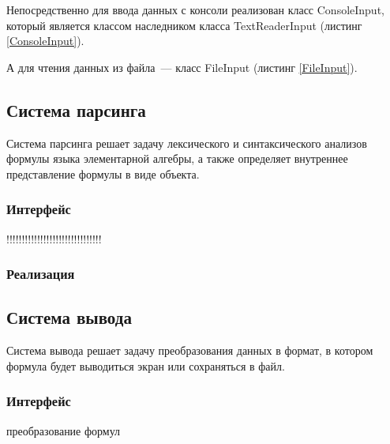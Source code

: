 

Непосредственно для ввода данных с консоли реализован класс ConsoleInput, который является классом наследником класса TextReaderInput (листинг \ref{ConsoleInput}).



А для чтения данных из файла~--- класс FileInput  (листинг \ref{FileInput}).



\subsection{Система парсинга}

Система парсинга решает задачу лексического и синтаксического анализов формулы языка элементарной алгебры, а также определяет внутреннее представление формулы в виде объекта.


\subsubsection{Интерфейс}

!!!!!!!!!!!!!!!!!!!!!!!!!!!!!!!


\subsubsection{Реализация}




\subsection{Система вывода}

Система вывода решает задачу преобразования данных в формат, в котором формула будет выводиться экран или сохраняться в файл.


\subsubsection{Интерфейс}

преобразование формул 



